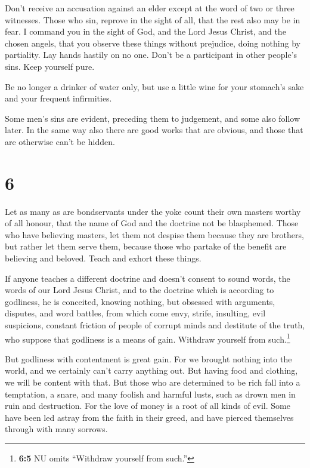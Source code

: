  Don't receive an accusation against an elder except at
the word of two or three witnesses.  Those who sin,
reprove in the sight of all, that the rest also may be in fear.
 I command you in the sight of God, and the Lord Jesus
Christ, and the chosen angels, that you observe these things without
prejudice, doing nothing by partiality.  Lay hands
hastily on no one. Don't be a participant in other people's sins. Keep
yourself pure.

 Be no longer a drinker of water only, but use a little
wine for your stomach's sake and your frequent infirmities.

 Some men's sins are evident, preceding them to
judgement, and some also follow later.  In the same way
also there are good works that are obvious, and those that are otherwise
can't be hidden.

\hypertarget{section-5}{%
\section{6}\label{section-5}}

 Let as many as are bondservants under the yoke count
their own masters worthy of all honour, that the name of God and the
doctrine not be blasphemed.  Those who have believing
masters, let them not despise them because they are brothers, but rather
let them serve them, because those who partake of the benefit are
believing and beloved. Teach and exhort these things.

 If anyone teaches a different doctrine and doesn't
consent to sound words, the words of our Lord Jesus Christ, and to the
doctrine which is according to godliness,  he is
conceited, knowing nothing, but obsessed with arguments, disputes, and
word battles, from which come envy, strife, insulting, evil suspicions,
 constant friction of people of corrupt minds and
destitute of the truth, who suppose that godliness is a means of gain.
Withdraw yourself from such.\footnote{\textbf{6:5} NU omits ``Withdraw
  yourself from such.''}

 But godliness with contentment is great gain.
 For we brought nothing into the world, and we certainly
can't carry anything out.  But having food and clothing,
we will be content with that.  But those who are
determined to be rich fall into a temptation, a snare, and many foolish
and harmful lusts, such as drown men in ruin and destruction.
 For the love of money is a root of all kinds of evil.
Some have been led astray from the faith in their greed, and have
pierced themselves through with many sorrows.

